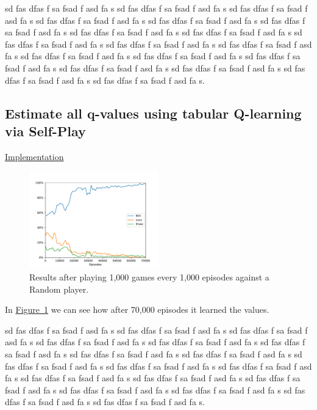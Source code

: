 \documentclass{article}
\newcommand{\GithubURL}[2]{
\noindent
\href{https://github.com/davidrobles/mlnd-capstone-code/blob/master/#1}{#2}
\break
}
\begin{document}
sd fas dfas f sa fsad f asd fa s sd fas dfas f sa fsad f asd fa s sd fas dfas f sa fsad f asd fa s
sd fas dfas f sa fsad f asd fa s sd fas dfas f sa fsad f asd fa s sd fas dfas f sa fsad f asd fa s
sd fas dfas f sa fsad f asd fa s sd fas dfas f sa fsad f asd fa s sd fas dfas f sa fsad f asd fa s
sd fas dfas f sa fsad f asd fa s sd fas dfas f sa fsad f asd fa s sd fas dfas f sa fsad f asd fa s
sd fas dfas f sa fsad f asd fa s sd fas dfas f sa fsad f asd fa s sd fas dfas f sa fsad f asd fa s
sd fas dfas f sa fsad f asd fa s sd fas dfas f sa fsad f asd fa s sd fas dfas f sa fsad f asd fa s.

\subsection{Estimate all q-values using tabular Q-learning via Self-Play}

\GithubURL{examples/tic_ql_tab_full_selfplay.py}{Implementation}

\begin{figure}[!h]
    \centering
    \includegraphics[width=0.50\textwidth]{figures/tic_ql_tab_full_selfplay_wld_plot.pdf}
    \caption{Results after playing 1,000 games every 1,000 episodes against a Random player.}
    \label{fig:tic-ql-tab-full-selfplay-wld-plot}
\end{figure}

In \hyperref[fig:tic-ql-tab-full-selfplay-wld-plot]
{Figure~\ref*{fig:tic-ql-tab-full-selfplay-wld-plot}} we can see how after 70,000 episodes it
learned the values.

sd fas dfas f sa fsad f asd fa s sd fas dfas f sa fsad f asd fa s sd fas dfas f sa fsad f asd fa s
sd fas dfas f sa fsad f asd fa s sd fas dfas f sa fsad f asd fa s sd fas dfas f sa fsad f asd fa s
sd fas dfas f sa fsad f asd fa s sd fas dfas f sa fsad f asd fa s sd fas dfas f sa fsad f asd fa s
sd fas dfas f sa fsad f asd fa s sd fas dfas f sa fsad f asd fa s sd fas dfas f sa fsad f asd fa s
sd fas dfas f sa fsad f asd fa s sd fas dfas f sa fsad f asd fa s sd fas dfas f sa fsad f asd fa s
sd fas dfas f sa fsad f asd fa s sd fas dfas f sa fsad f asd fa s sd fas dfas f sa fsad f asd fa s.
\end{document}
